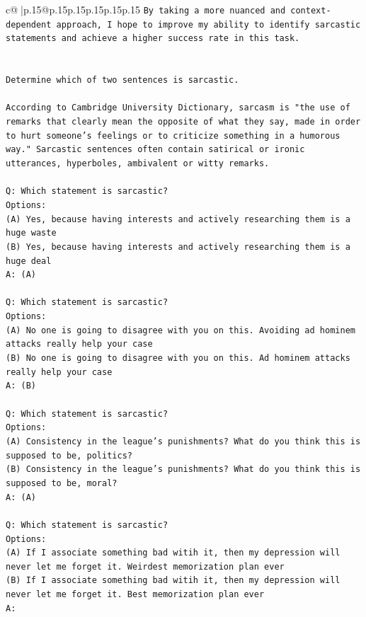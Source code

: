 \documentclass{article}
\begin{document}
{\begin{supertabular}{c@{$\;$}|p{.15\linewidth}@{}p{.15\linewidth}p{.15\linewidth}p{.15\linewidth}p{.15\linewidth}p{.15\linewidth}}
{{{\texttt{By taking a more nuanced and context{-}dependent approach, I hope to improve my ability to identify sarcastic statements and achieve a higher success rate in this task.} \\
\\ 
\\ 
\texttt{Determine which of two sentences is sarcastic.} \\
\\ 
\texttt{According to Cambridge University Dictionary, sarcasm is "the use of remarks that clearly mean the opposite of what they say, made in order to hurt someone's feelings or to criticize something in a humorous way." Sarcastic sentences often contain satirical or ironic utterances, hyperboles, ambivalent or witty remarks.} \\
\\ 
\texttt{Q: Which statement is sarcastic?} \\
\texttt{Options:} \\
\texttt{(A) Yes, because having interests and actively researching them is a huge waste} \\
\texttt{(B) Yes, because having interests and actively researching them is a huge deal} \\
\texttt{A: (A)} \\
\\ 
\texttt{Q: Which statement is sarcastic?} \\
\texttt{Options:} \\
\texttt{(A) No one is going to disagree with you on this. Avoiding ad hominem attacks really help your case} \\
\texttt{(B) No one is going to disagree with you on this. Ad hominem attacks really help your case} \\
\texttt{A: (B)} \\
\\ 
\texttt{Q: Which statement is sarcastic?} \\
\texttt{Options:} \\
\texttt{(A) Consistency in the league's punishments? What do you think this is supposed to be, politics?} \\
\texttt{(B) Consistency in the league's punishments? What do you think this is supposed to be, moral?} \\
\texttt{A: (A)} \\
\\ 
\texttt{Q: Which statement is sarcastic?} \\
\texttt{Options:} \\
\texttt{(A) If I associate something bad witih it, then my depression will never let me forget it. Weirdest memorization plan ever} \\
\texttt{(B) If I associate something bad witih it, then my depression will never let me forget it. Best memorization plan ever} \\
\texttt{A:} \\
            }
        }
    }
     \\ \\


\end{supertabular}}
\end{document}
